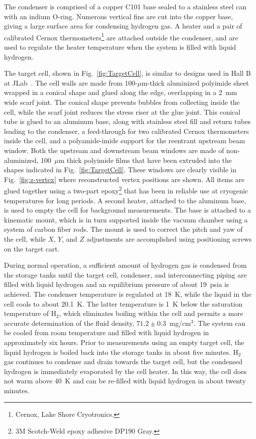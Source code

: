The condenser is comprised of a copper C101 base
sealed to a stainless steel can with an indium O-ring.  Numerous vertical 
fins are cut into the copper base, giving a large surface area for condensing hydrogen gas.
A heater and a pair of calibrated Cernox thermometers\footnote{Cernox, Lake Shore Cryotronics.}
are attached outside the condenser, and are used to regulate the heater temperature when the
system is filled with liquid hydrogen.

The target cell, shown in Fig.~\ref{fig:TargetCell}, is similar to
designs used in Hall B at JLab~\cite{HAKOBYAN2008218}.  
The cell walls are made from 100-$\mu$m-thick aluminized
polyimide sheet wrapped in a conical shape and glued along the edge,
overlapping in a 2~mm wide scarf joint.  
The conical shape prevents bubbles from collecting inside the cell, while the
scarf joint reduces the stress riser at the glue joint.  This conical
tube is glued to an aluminum base, 
along with stainless steel fill and return tubes leading to the condenser, a feed-through for two calibrated Cernox thermometers inside the cell, and a
polyamide-imide support for the reentrant upstream beam window.  
Both the upstream and downstream beam
windows are made of non-aluminized,
100~$\mu$m thick polyimide films that have been extruded into the
shapes indicated in Fig.~\ref{fig:TargetCell}. These windows are clearly
visible in Fig.~\ref{fig:z-vertex} where reconstructed vertex positions are shown. All items are glued together using
a two-part epoxy\footnote{3M Scotch-Weld epoxy adhesive DP190 Gray.}
that has been in reliable use at cryogenic temperatures for long periods. 
A second  heater, attached to the aluminum base,
is used to empty the cell for background measurements.
The base is attached to a kinematic mount, which is in turn
supported inside the vacuum chamber using a system of carbon fiber rods.    
The mount is used to correct the pitch and yaw
of the cell, while $X$, $Y$, and $Z$ adjustments 
are accomplished using positioning screws on the target cart. 


During normal operation, a sufficient amount of hydrogen gas is condensed from the storage tanks
until the target cell, condenser, and interconnecting piping are filled with liquid hydrogen
and an equilibrium pressure of about 19~psia is achieved.  
The condenser temperature is regulated at 18~K, while the
liquid in the cell cools to about 20.1~K. The latter temperature is 1~K below the saturation
temperature of H$_2$, which eliminates boiling within the cell and permits a more
accurate determination of the fluid density, 
$71.2 \pm 0.3$~mg/cm$^3$.  
The system can be cooled from room temperature and filled with liquid hydrogen in
approximately six hours.  Prior to measurements using an empty target cell, the liquid hydrogen is boiled back into the storage tanks in about five minutes.  H$_2$ gas continues to condense and drain towards the target cell, but the condensed hydrogen is immediately 
evaporated by the cell heater.  In this way, the cell does not warm above 40~K and
can be re-filled with liquid hydrogen in about twenty minutes.

